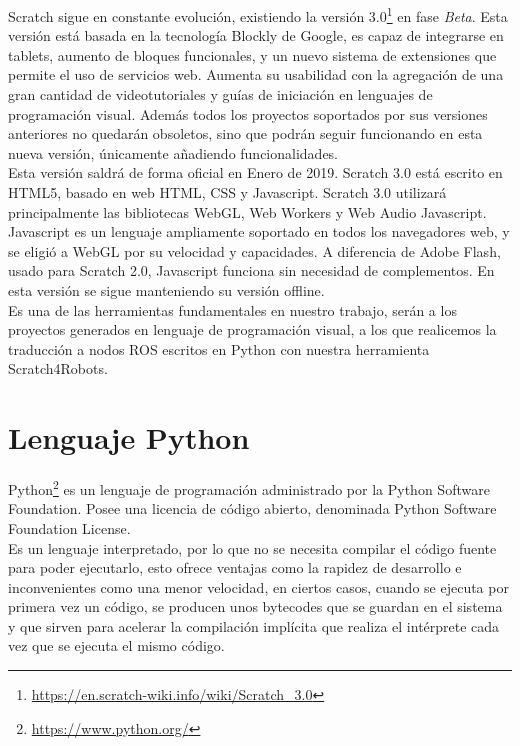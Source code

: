 Scratch sigue en constante evolución, existiendo la versión 3.0\footnote{\url{https://en.scratch-wiki.info/wiki/Scratch_3.0}} en fase \textit{Beta}. Esta versión está basada en la tecnología Blockly de Google, es capaz de integrarse en tablets, aumento de bloques funcionales, y un nuevo sistema de extensiones que permite el uso de servicios web. Aumenta su usabilidad con la agregación de una gran cantidad de videotutoriales y guías de iniciación en lenguajes de programación visual. Además todos los proyectos soportados por sus versiones anteriores no quedarán obsoletos, sino que podrán seguir funcionando en esta nueva versión, únicamente añadiendo funcionalidades.\\

Esta versión saldrá de forma oficial en Enero de 2019. Scratch 3.0 está escrito en HTML5, basado en web HTML, CSS y Javascript. Scratch 3.0 utilizará principalmente las bibliotecas WebGL, Web Workers y Web Audio Javascript. Javascript es un lenguaje ampliamente soportado en todos los navegadores web, y se eligió a WebGL por su velocidad y capacidades. A diferencia de Adobe Flash, usado para Scratch 2.0, Javascript funciona sin necesidad de complementos. En esta versión se sigue manteniendo su versión offline.\\

Es una de las herramientas fundamentales en nuestro trabajo, serán a los proyectos generados en lenguaje de programación visual, a los que realicemos la traducción a nodos ROS escritos en Python con nuestra herramienta Scratch4Robots.

\section{Lenguaje Python}
\label{sec:python}
 
Python\footnote{\url{https://www.python.org/}} es un lenguaje de programación administrado por la Python Software Foundation. Posee una licencia de código abierto, denominada Python Software Foundation License.\\

Es un lenguaje interpretado, por lo que no se necesita compilar el código fuente para poder ejecutarlo, esto ofrece ventajas como la rapidez de desarrollo e inconvenientes como una menor velocidad, en ciertos casos, cuando se ejecuta por primera vez un código, se producen unos bytecodes que se guardan en el sistema y que sirven para acelerar la compilación implícita que realiza el intérprete cada vez que se ejecuta el mismo código. \\

